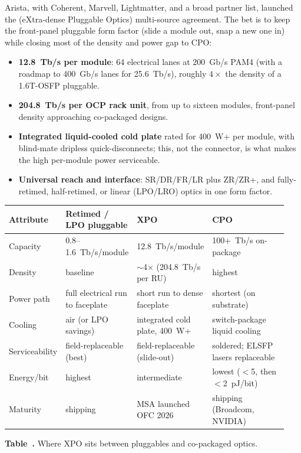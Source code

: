 Arista, with Coherent, Marvell, Lightmatter, and a broad partner list, launched the
 (eXtra-dense Pluggable Optics) multi-source agreement. The bet is to keep
the front-panel pluggable form factor (slide a module out, snap a new one in) while
closing most of the density and power gap to CPO:

\begin{itemize}
\item \textbf{12.8~Tb/s per module}: 64 electrical lanes at 200~Gb/s PAM4 (with a
      roadmap to 400~Gb/s lanes for 25.6~Tb/s), roughly $4\times$ the density of a
      1.6T-OSFP pluggable.
\item \textbf{204.8~Tb/s per OCP rack unit}, from up to sixteen modules, front-panel
      density approaching co-packaged designs.
\item \textbf{Integrated liquid-cooled cold plate} rated for 400~W+ per module, with
      blind-mate dripless quick-disconnects; this, not the connector, is what makes
      the high per-module power serviceable.
\item \textbf{Universal reach and interface}: SR/DR/FR/LR plus ZR/ZR+, and
      fully-retimed, half-retimed, or linear (LPO/LRO) optics in one form factor.
\end{itemize}

\begin{table}[ht]
\label{tab:xpo-compare}%
\centering
\setlength{\tabcolsep}{5pt}%
\footnotesize
\renewcommand{\arraystretch}{1.25}%
\begin{tabular}{@{}p{0.12\linewidth}p{0.22\linewidth}p{0.22\linewidth}p{0.38\linewidth}@{}}
\toprule
Attribute & Retimed / LPO pluggable & XPO & CPO \\
\midrule
Capacity & 0.8--1.6~Tb/s/module & 12.8~Tb/s/module & 100+~Tb/s on-package \\
\addlinespace[1.5em]
Density & baseline & $\sim$4$\times$ (204.8~Tb/s per RU) & highest \\
\addlinespace[1.5em]
Power path & full electrical run to faceplate & short run to dense faceplate & shortest (on substrate) \\
\addlinespace[1.5em]
Cooling & air (or LPO savings) & integrated cold plate, 400~W+ & switch-package liquid cooling \\
\addlinespace[1.5em]
Serviceability & field-replaceable (best) & field-replaceable (slide-out) & soldered; ELSFP lasers replaceable \\
\addlinespace[1.5em]
Energy/bit & highest & intermediate & lowest ($<$5, then $<$2~pJ/bit) \\
\addlinespace[1.5em]
Maturity & shipping & MSA launched OFC 2026 & shipping (Broadcom, NVIDIA) \\
\bottomrule
\end{tabular}
\par\medskip
{\raggedright\footnotesize\textbf{Table~\thetable.} Where XPO sits between pluggables and co-packaged optics.\par}
\end{table}

